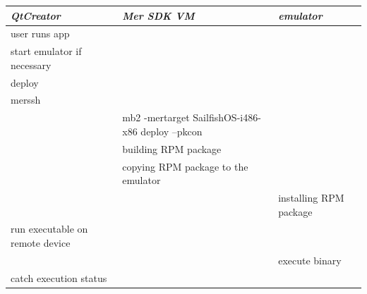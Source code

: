 \begin{tabular}{l|l|l}
  \emph{QtCreator} & \emph{Mer SDK VM} & \emph{emulator} \\ \hline
  \parbox[t]{0.33\textwidth}{user runs app} &
  \parbox[t]{0.33\textwidth}{} &
  \parbox[t]{0.33\textwidth}{} \\ \hline
  \parbox[t]{0.33\textwidth}{start emulator if necessary} &
  \parbox[t]{0.33\textwidth}{} &
  \parbox[t]{0.33\textwidth}{} \\ \hline
  \parbox[t]{0.33\textwidth}{deploy} &
  \parbox[t]{0.33\textwidth}{} &
  \parbox[t]{0.33\textwidth}{} \\ \hline
  \parbox[t]{0.33\textwidth}{merssh} &
  \parbox[t]{0.33\textwidth}{} &
  \parbox[t]{0.33\textwidth}{} \\ \hline
  \parbox[t]{0.33\textwidth}{} &
  \parbox[t]{0.33\textwidth}{mb2 -mertarget SailfishOS-i486-x86 deploy --pkcon} &
  \parbox[t]{0.33\textwidth}{} \\ \hline
  \parbox[t]{0.33\textwidth}{} &
  \parbox[t]{0.33\textwidth}{building RPM package} &
  \parbox[t]{0.33\textwidth}{} \\ \hline
  \parbox[t]{0.33\textwidth}{} &
  \parbox[t]{0.33\textwidth}{copying RPM package to the emulator} &
  \parbox[t]{0.33\textwidth}{} \\ \hline
  \parbox[t]{0.33\textwidth}{} &
  \parbox[t]{0.33\textwidth}{} &
  \parbox[t]{0.33\textwidth}{installing RPM package} \\ \hline
  \parbox[t]{0.33\textwidth}{run executable on remote device} &
  \parbox[t]{0.33\textwidth}{} &
  \parbox[t]{0.33\textwidth}{} \\ \hline
  \parbox[t]{0.33\textwidth}{} &
  \parbox[t]{0.33\textwidth}{} &
  \parbox[t]{0.33\textwidth}{execute binary} \\ \hline
  \parbox[t]{0.33\textwidth}{catch execution status} &
  \parbox[t]{0.33\textwidth}{} &
  \parbox[t]{0.33\textwidth}{} \\ \hline
\end{tabular} \\
%